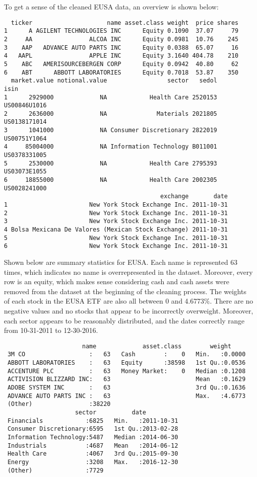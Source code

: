 \documentclass[12pt,twoside]{reedthesis}
\theoremstyle{definition}
\theoremstyle{definition}
\theoremstyle{definition}
\theoremstyle{remark}
\begin{document}
To get a sense of the cleaned EUSA data, an overview is shown below:
\begin{verbatim}
  ticker                     name asset.class weight  price shares
1      A AGILENT TECHNOLOGIES INC      Equity 0.1090  37.07     79
2     AA                ALCOA INC      Equity 0.0981  10.76    245
3    AAP   ADVANCE AUTO PARTS INC      Equity 0.0388  65.07     16
4   AAPL                APPLE INC      Equity 3.1640 404.78    210
5    ABC   AMERISOURCEBERGEN CORP      Equity 0.0942  40.80     62
6    ABT      ABBOTT LABORATORIES      Equity 0.7018  53.87    350
  market.value notional.value                 sector   sedol         isin
1      2929000             NA            Health Care 2520153 US00846U1016
2      2636000             NA              Materials 2021805 US0138171014
3      1041000             NA Consumer Discretionary 2822019 US00751Y1064
4     85004000             NA Information Technology B011001 US0378331005
5      2530000             NA            Health Care 2795393 US03073E1055
6     18855000             NA            Health Care 2002305 US0028241000
                                            exchange       date
1                       New York Stock Exchange Inc. 2011-10-31
2                       New York Stock Exchange Inc. 2011-10-31
3                       New York Stock Exchange Inc. 2011-10-31
4 Bolsa Mexicana De Valores (Mexican Stock Exchange) 2011-10-31
5                       New York Stock Exchange Inc. 2011-10-31
6                       New York Stock Exchange Inc. 2011-10-31
\end{verbatim}
Shown below are summary statistics for EUSA. Each name is represented 63
times, which indicates no name is overrepresented in the dataset.
Moreover, every row is an equity, which makes sense considering cash and
cash assets were removed from the dataset at the beginning of the
cleaning process. The weights of each stock in the EUSA ETF are also all
between 0 and 4.6773\%. There are no negative values and no stocks that
appear to be incorrectly overweight. Moreover, each sector appears to be
reasonably distributed, and the dates correctly range from 10-31-2011 to
12-30-2016.
\begin{verbatim}
                      name             asset.class        weight      
 3M CO                  :   63   Cash        :    0   Min.   :0.0000  
 ABBOTT LABORATORIES    :   63   Equity      :38598   1st Qu.:0.0536  
 ACCENTURE PLC          :   63   Money Market:    0   Median :0.1208  
 ACTIVISION BLIZZARD INC:   63                        Mean   :0.1629  
 ADOBE SYSTEM INC       :   63                        3rd Qu.:0.1636  
 ADVANCE AUTO PARTS INC :   63                        Max.   :4.6773  
 (Other)                :38220                                        
                    sector          date           
 Financials            :6825   Min.   :2011-10-31  
 Consumer Discretionary:6595   1st Qu.:2013-02-28  
 Information Technology:5487   Median :2014-06-30  
 Industrials           :4687   Mean   :2014-06-12  
 Health Care           :4067   3rd Qu.:2015-09-30  
 Energy                :3208   Max.   :2016-12-30  
 (Other)               :7729                       
\end{verbatim}
\end{document}
